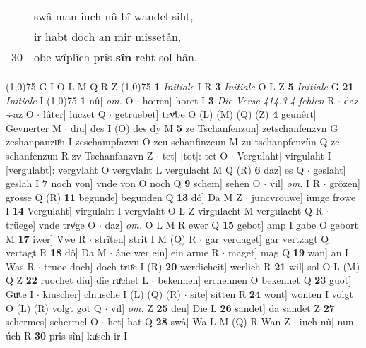 \documentclass[8pt,a4paper,notitlepage]{article}
\begin{document}
\begin{table}[ht]
\begin{minipage}[t]{0.5\linewidth}
\begin{tabular}{rl}
 & swâ man iuch nû bî wandel siht,\\ 
 & ir habt doch an mir missetân,\\ 
30 & obe wîplîch prîs \textbf{sîn} reht sol hân.\\ 
\end{tabular}
\scriptsize
\line(1,0){75} \newline
G I O L M Q R Z \newline
\line(1,0){75} \newline
\textbf{1} \textit{Initiale} I R  \textbf{3} \textit{Initiale} O L Z  \textbf{5} \textit{Initiale} G  \textbf{21} \textit{Initiale} I  \newline
\line(1,0){75} \newline
\textbf{1} nû] \textit{om.} O  $\cdot$ hœren] horet I \textbf{3} \textit{Die Verse 414.3-4 fehlen} R   $\cdot$ daz] ÷az O  $\cdot$ lûter] luczet Q  $\cdot$ getrüebet] trvͦbe O (L) (M) (Q) (Z) \textbf{4} geunêrt] Gevnerter M  $\cdot$ diu] des I (O) des dy M \textbf{5} ze Tschanfenzun] zetschanfenzvn G zeshanpanzuͤn I zeschampfazvn O zcu schanfinzcun M zu tschanpfenzűn Q ze schanfenzun R zv Tschanfanzvn Z  $\cdot$ tet] [tot]: tet O  $\cdot$ Vergulaht] virgulaht I [vergulabt]: vergvlaht O vergvlaht L vergulacht M Q (R) \textbf{6} daz] es Q  $\cdot$ geslaht] geslah I \textbf{7} noch von] vnde von O noch Q \textbf{9} schem] sehen O  $\cdot$ vil] \textit{om.} I R  $\cdot$ grôzen] grosse Q (R) \textbf{11} begunde] begunden Q \textbf{13} dô] Da M Z  $\cdot$ juncvrouwe] iunge frowe I \textbf{14} Vergulaht] virgulaht I vergvlaht O L Z virgulacht M vergulacht Q R  $\cdot$ trüege] vnde trvͦge O  $\cdot$ daz] \textit{om.} O L M R ewer Q \textbf{15} gebot] amp I gabe O gebort M \textbf{17} iwer] V́we R  $\cdot$ strîten] strit I M (Q) R  $\cdot$ gar verdaget] gar vertzagt Q vertagt R \textbf{18} dô] Da M  $\cdot$ âne wer ein] ein arme R  $\cdot$ maget] mag Q \textbf{19} wan] an I Was R  $\cdot$ truoc doch] doch truͤc I (R) \textbf{20} werdicheit] werlich R \textbf{21} wil] sol O L (M) Q Z \textbf{22} ruochet diu] die ruͯchet L  $\cdot$ bekennen] erchennen O bekennet Q \textbf{23} guot] Guͤte I  $\cdot$ kiuscher] chiusche I (L) (Q) (R)  $\cdot$ site] sitten R \textbf{24} wont] wonten I volgt O (L) (R) volgt got Q  $\cdot$ vil] \textit{om.} Z \textbf{25} den] Die L \textbf{26} sandet] da sandet Z \textbf{27} schermes] schermel O  $\cdot$ het] hat Q \textbf{28} swâ] Wa L M (Q) R Wan Z  $\cdot$ iuch nû] nun úch R \textbf{30} prîs sîn] kuͤsch ir I \newline
\end{minipage}

\end{table}
\end{document}
